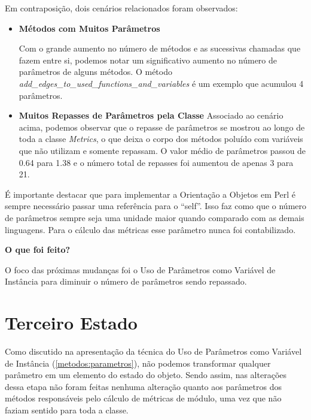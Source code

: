 

Em contraposição, dois cenários relacionados foram observados:

\begin{itemize}
\item
\textbf{Métodos com Muitos Parâmetros}

Com o grande aumento no número de métodos e as sucessivas chamadas que fazem entre si,
podemos notar um significativo aumento no número de parâmetros de alguns métodos.
O método \textit{add\_edges\_to\_used\_functions\_and\_variables} é um exemplo que acumulou
4 parâmetros.



\item
\textbf{Muitos Repasses de Parâmetros pela Classe}
Associado ao cenário acima, podemos observar que o repasse de parâmetros se mostrou
ao longo de toda a classe \textit{Metrics}, o que deixa o corpo dos métodos poluído
com variáveis que não utilizam e somente repassam. O valor médio de parâmetros
passou de 0.64 para 1.38 e o número total de repasses foi aumentou de apenas 3 para 21.


\end{itemize}

É importante destacar que para implementar a Orientação a Objetos em Perl é sempre necessário
passar uma referência para o ``self''. Isso faz como que o número de parâmetros sempre
seja uma unidade maior quando comparado com as demais linguagens. Para o cálculo das métricas
esse parâmetro nunca foi contabilizado.

\vskip 1.0cm
\textbf{O que foi feito?}

O foco das próximas mudanças foi o Uso de Parâmetros como Variável de Instância para diminuir
o número de parâmetros sendo repassado.

\section{Terceiro Estado}

Como discutido na apresentação da técnica do Uso de Parâmetros como Variável de
Instância (\ref{metodos:parametros}), não podemos transformar qualquer parâmetro em 
um elemento do estado do objeto. Sendo assim, nas alterações dessa etapa não foram feitas
nenhuma alteração quanto aos parâmetros dos métodos responsáveis pelo cálculo de métricas
de módulo, uma vez que não faziam sentido para toda a classe.


